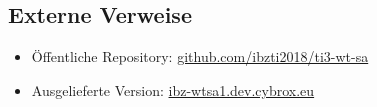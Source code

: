 \subsection{Externe Verweise}
\begin{itemize}
  \item Öffentliche Repository: \href{https://github.com/ibzti2018/ti3-wt-sa}{github.com/ibzti2018/ti3-wt-sa}
  \item Ausgelieferte Version: \href{https://ibz-wtsa1.dev.cybrox.eu/}{ibz-wtsa1.dev.cybrox.eu}
\end{itemize}
